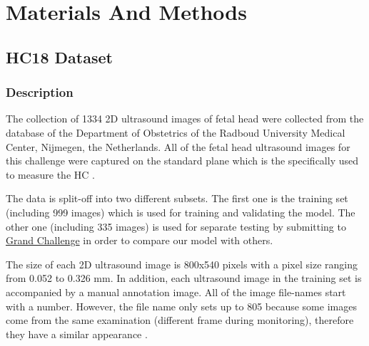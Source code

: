 \chapter{Materials And Methods}
\section{HC18 Dataset}
\subsection{Description}
\label{subsection:dataset}
\noindent

	The collection of 1334 2D ultrasound images of fetal head were collected from the database of the Department of Obstetrics of the Radboud University Medical Center, Nijmegen, the Netherlands. All of the fetal head ultrasound images for this challenge were captured on the standard plane which is the specifically used to measure the HC \cite{thomas}.
	
	The data is split-off into two different subsets. The first one is the training set (including 999 images) which is used for training and validating the model. The other one (including 335 images) is used for separate testing by submitting to \href{https://hc18.grand-challenge.org/}{Grand Challenge} in order to compare our model with others.
	
	
	The size of each 2D ultrasound image is 800x540 pixels with a pixel size ranging from 0.052 to 0.326 mm. In addition, each ultrasound image in the training set is accompanied by a manual annotation image. All of the image file-names start with a number. However, the file name only sets up to 805 because some images come from the same examination (different frame during monitoring), therefore they have a similar appearance \cite{thomas}.
	
